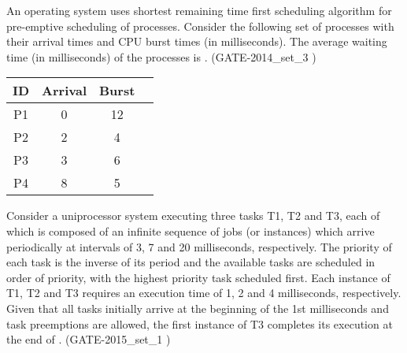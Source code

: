 \begin{questyle}

  \question  An operating system uses shortest remaining time first scheduling algorithm for pre-emptive
            scheduling of processes. Consider the following set of processes with their arrival times and
            CPU burst times (in milliseconds). The average waiting time (in milliseconds) of the
            processes is \fillin[5.5]. (GATE-2014\_set\_3 )

    \begin{myTableStyle}
    \begin{center}
    \begin{tabular}{ |c|c|c|c| } \hline
          ID & Arrival &  Burst     \\ \hline
          P1 & 0 & 12     \\ \hline
          P2 & 2 & 4     \\ \hline
          P3 & 3 & 6     \\ \hline
          P4 & 8 & 5      \\ \hline
    \end{tabular}
    \end{center}
  \end{myTableStyle}
  \vspace{0.08in}

  \end{questyle}




\begin{questyle}

  \question  Consider a uniprocessor system executing three tasks T1, T2 and T3, each of which is
            composed of an infinite sequence of jobs (or instances) which arrive periodically at intervals
            of 3, 7 and 20 milliseconds, respectively. The priority of each task is the inverse of
            its period and the available tasks are scheduled in order of priority, with the highest
            priority task scheduled first. Each instance of T1, T2 and T3 requires an execution time
            of 1, 2 and 4 milliseconds, respectively. Given that all tasks initially arrive at the
            beginning of the 1st milliseconds and task preemptions are allowed, the first
            instance of T3 completes its execution at the end of \fillin[12]. (GATE-2015\_set\_1 )

  \end{questyle}



